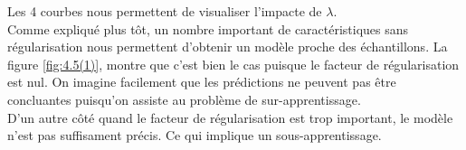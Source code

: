 Les 4 courbes nous permettent de visualiser l'impacte de $\lambda$. \\
Comme expliqué plus tôt, un nombre important de caractéristiques sans régularisation nous permettent d'obtenir un modèle proche des échantillons. La figure \ref{fig:4.5(1)}, montre que c'est bien le 
cas puisque le facteur de régularisation est nul. On imagine facilement que les prédictions ne peuvent pas être concluantes puisqu'on assiste au problème de sur-apprentissage. \\
D'un autre côté quand le facteur de régularisation est trop important, le modèle n'est pas suffisament précis. Ce qui implique un sous-apprentissage.
